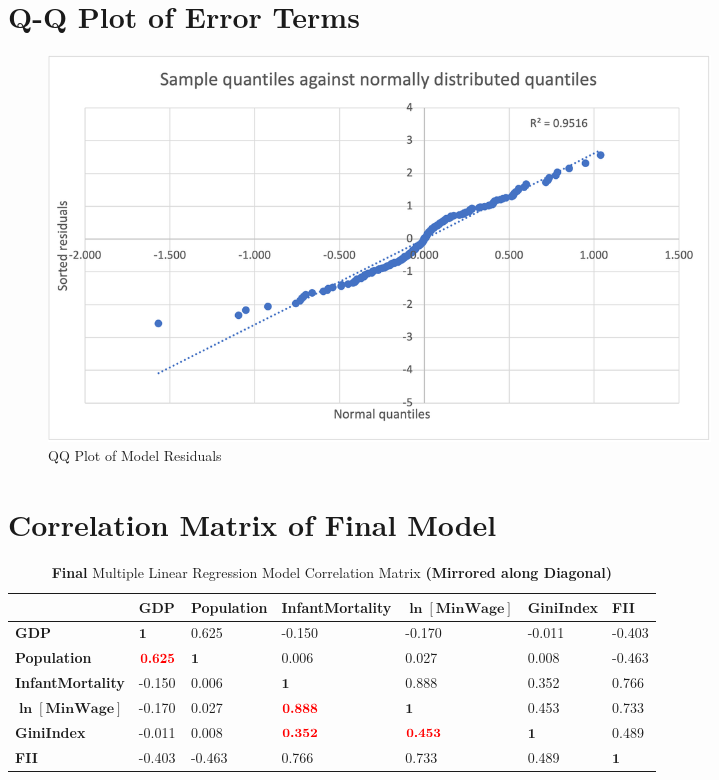 \documentclass{article}
\begin{document}
\begin{appendices}
\section{Q-Q Plot of Error Terms}

\begin{figure}[H]
    \centering
    \includegraphics[width=0.85\textwidth]{Images/QQplot.png}
    \caption{QQ Plot of Model Residuals}
    \label{fig:qqplotresid}
\end{figure}

\section{Correlation Matrix of Final Model}

\begin{table}[H]
    \centering
        \begin{threeparttable}
            \begin{tabular}{l l l l l l l}
              \toprule & \textbf{GDP} & \textbf{Population} & \textbf{InfantMortality} & \textbf{$\bm{\ln{[\text{MinWage}]}}$} & \textbf{GiniIndex} & \textbf{FII} \\ \midrule 
            \textbf{GDP} & $\bm{1}$ & 0.625 & -0.150 & -0.170 & -0.011 & -0.403 \\ 
            \textbf{Population} & $\bm{\textcolor{red}{0.625}}$ & $\bm{1}$ & 0.006 & 0.027 & 0.008 & -0.463 \\ 
            \textbf{InfantMortality} & -0.150 & 0.006 & $\bm{1}$ & 0.888 & 0.352 & 0.766 \\ 
            \textbf{$\bm{\ln{[\text{MinWage}]}}$} & -0.170 & 0.027 & $\bm{\textcolor{red}{0.888}}$ & $\bm{1}$ & 0.453 & 0.733 \\ 
            \textbf{GiniIndex} & -0.011 & 0.008 & $\bm{\textcolor{red}{0.352}}$ & $\bm{\textcolor{red}{0.453}}$ & $\bm{1}$ & 0.489\\ 
            \textbf{FII} & -0.403 & -0.463 & 0.766 & 0.733 & 0.489 & $\bm{1}$ \\ \bottomrule
            \end{tabular}
        \end{threeparttable}
    \caption{\label{table: corrmatrix}\textbf{Final} Multiple Linear Regression Model Correlation Matrix \textbf{(Mirrored along Diagonal)}}
\end{table}

\end{appendices}

\newpage


\end{document}
